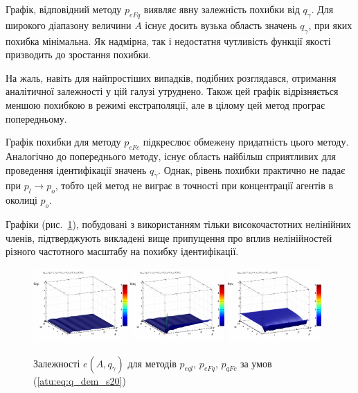 Графік, відповідний методу $p_{eFq}$ виявляє явну залежність похибки від
$q_\gamma$. Для широкого діапазону величини $ A $ існує досить вузька область
значень $q_\gamma$, при яких похибка мінімальна. Як надмірна, так і
недостатня чутливість функції якості призводить до зростання похибки.

На жаль, навіть для найпростіших випадків, подібних розглядався,
отримання аналітичної залежності у цій галузі утруднено. Також
цей графік відрізняється меншою похибкою в режимі
екстраполяції, але в цілому цей метод програє попередньому.

Графік похибки для методу $p_{eFc}$ підкреслює обмежену придатність цього методу.
Аналогічно до попереднього методу, існує область найбільш
сприятливих для проведення ідентифікації значень
$ q_\gamma $. Однак, рівень похибки практично не падає при
$ p_l \to p_o $, тобто цей метод не виграє в точності при концентрації
агентів в околиці
$ p_o $.

Графіки (рис.~\ref{atu:f:qsl_pe_A_qg_s20}), побудовані з використанням тільки
високочастотних нелінійних членів, підтверджують викладені
вище припущення про вплив нелінійностей різного частотного
масштабу на похибку ідентифікації.

\begin{figure}[htb!]
  \begin{center}
    \includegraphics[width=0.32\textwidth]{p/qls_pe-p_A_qg_eql_s20.png}
    \hfill
    \includegraphics[width=0.32\textwidth]{p/qls_pe-p_A_qg_eFq_s20.png}
    \hfill
    \includegraphics[width=0.32\textwidth]{p/qls_pe-p_A_qg_eFc_s20.png}
  \end{center}
  \caption{Залежності $e(A,q_\gamma)$ для методів $p_{eql}$, $p_{eFq}$, $p_{qFc}$ за умов (\ref{atu:eq:q_dem_s20})}
  \label{atu:f:qsl_pe_A_qg_s20}
\end{figure}

